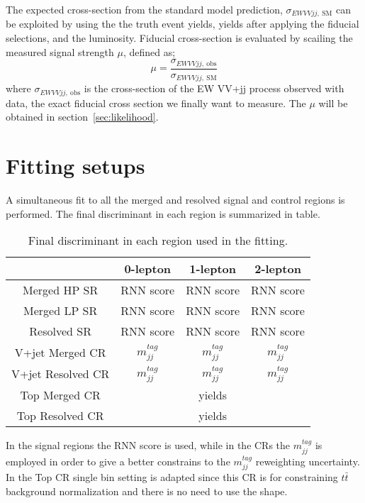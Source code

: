 The expected cross-section from the standard model prediction, $\sigma_{EW VVjj \mathrm{, \ SM}}$ can be exploited by using the the truth event yields, yields after applying the fiducial selections, and the luminosity.
Fiducial cross-section is evaluated by scailing the measured signal strength $\mu$, defined as;
\begin{equation}
\mu = \frac{\sigma_{EW VVjj \mathrm{, \ obs}}}{\sigma_{EW VVjj \mathrm{, \ SM}}}
\end{equation}
where $\sigma_{EW VVjj \mathrm{, \ obs}}$ is the cross-section of the EW VV+jj process observed with data, the exact fiducial cross section we finally want to measure.
The $\mu$ will be obtained in section~\ref{sec:likelihood}.

\section{Fitting setups}
A simultaneous fit to all the merged and resolved signal and control regions is performed.
The final discriminant in each region is summarized in table.
\begin{table}[htbp]
 \footnotesize
\begin{center}
\begin{tabular}{ | c | c | c | c |} \hline
                      & 0-lepton        & 1-lepton       & 2-lepton  \\ \hline \hline
Merged HP SR          &  RNN score      &  RNN score     & RNN score     \\ \hline
Merged LP SR          &  RNN score      &  RNN score     & RNN score     \\ \hline
Resolved SR           &  RNN score      &  RNN score     & RNN score     \\ \hline \hline
V+jet Merged CR       & $m^{tag}_{jj}$  & $m^{tag}_{jj}$ & $m^{tag}_{jj}$\\ \hline 
V+jet Resolved CR     & $m^{tag}_{jj}$  & $m^{tag}_{jj}$ & $m^{tag}_{jj}$\\ \hline
Top Merged CR         &                 & yields         &               \\ \hline
Top Resolved CR       &                 & yields         &               \\ \hline
\end{tabular}
\caption{\label{tab:discriminant} Final discriminant in each region used in the fitting. }
\end{center}
\end{table}
In the signal regions the RNN score is used, while in the CRs the $m^{tag}_{jj}$ is employed in order to give a better constrains to the $m^{tag}_{jj}$ reweighting uncertainty. In the Top CR single bin setting is adapted since this CR is for constraining $t\bar{t}$ background normalization and there is no need to use the shape. 
